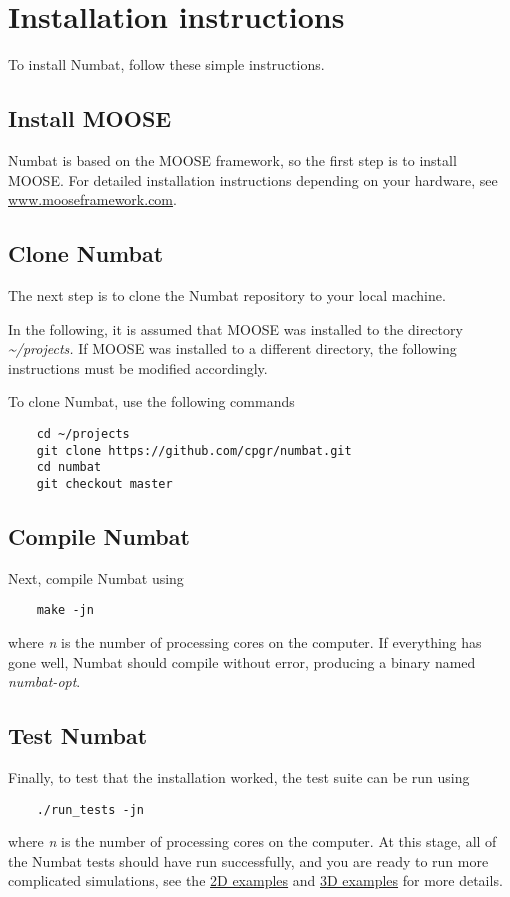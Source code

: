 \section{Installation instructions}\label{installation-instructions}

To install Numbat, follow these simple instructions.

\subsection{Install MOOSE}\label{install-moose}

Numbat is based on the MOOSE framework, so the first step is to install
MOOSE. For detailed installation instructions depending on your
hardware, see
\href{http://www.mooseframework.com}{www.mooseframework.com}.

\subsection{Clone Numbat}\label{clone-numbat}

The next step is to clone the Numbat repository to your local machine.

In the following, it is assumed that MOOSE was installed to the
directory \emph{\textasciitilde{}/projects.} If MOOSE was installed to a
different directory, the following instructions must be modified
accordingly.

To clone Numbat, use the following commands

\begin{verbatim}
    cd ~/projects
    git clone https://github.com/cpgr/numbat.git
    cd numbat
    git checkout master
\end{verbatim}

\subsection{Compile Numbat}\label{compile-numbat}

Next, compile Numbat using

\begin{verbatim}
    make -jn
\end{verbatim}

where \emph{n} is the number of processing cores on the computer. If
everything has gone well, Numbat should compile without error, producing
a binary named \emph{numbat-opt}.

\subsection{Test Numbat}\label{test-numbat}

Finally, to test that the installation worked, the test suite can be run
using

\begin{verbatim}
    ./run_tests -jn
\end{verbatim}

where \emph{n} is the number of processing cores on the computer. At
this stage, all of the Numbat tests should have run successfully, and
you are ready to run more complicated simulations, see the
\href{/example2D.md}{2D examples} and \href{/example3D.md}{3D examples}
for more details.
